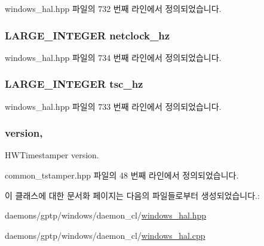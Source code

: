 windows\+\_\+hal.\+hpp 파일의 732 번째 라인에서 정의되었습니다.

\subsubsection[{\texorpdfstring{netclock\+\_\+hz}{netclock_hz}}]{\setlength{\rightskip}{0pt plus 5cm}L\+A\+R\+G\+E\+\_\+\+I\+N\+T\+E\+G\+ER netclock\+\_\+hz\hspace{0.3cm}{\ttfamily [private]}}\hypertarget{class_windows_ether_timestamper_a9e4ba46145b31b628733af60187fc3c6}{}\label{class_windows_ether_timestamper_a9e4ba46145b31b628733af60187fc3c6}


windows\+\_\+hal.\+hpp 파일의 734 번째 라인에서 정의되었습니다.

\subsubsection[{\texorpdfstring{tsc\+\_\+hz}{tsc_hz}}]{\setlength{\rightskip}{0pt plus 5cm}L\+A\+R\+G\+E\+\_\+\+I\+N\+T\+E\+G\+ER tsc\+\_\+hz\hspace{0.3cm}{\ttfamily [private]}}\hypertarget{class_windows_ether_timestamper_a259066718bc34c6231bbefd0b7093b6e}{}\label{class_windows_ether_timestamper_a259066718bc34c6231bbefd0b7093b6e}


windows\+\_\+hal.\+hpp 파일의 733 번째 라인에서 정의되었습니다.

\subsubsection[{\texorpdfstring{version}{version}}]{ version\hspace{0.3cm}{\ttfamily [protected]}, {\ttfamily [inherited]}}\hypertarget{class_common_timestamper_ab22abc2906422da61885ac6c8e6a1a59}{}\label{class_common_timestamper_ab22abc2906422da61885ac6c8e6a1a59}


H\+W\+Timestamper version. 



common\+\_\+tstamper.\+hpp 파일의 48 번째 라인에서 정의되었습니다.



이 클래스에 대한 문서화 페이지는 다음의 파일들로부터 생성되었습니다.\+:\begin{DoxyCompactItemize}
\item 
daemons/gptp/windows/daemon\+\_\+cl/\hyperlink{windows__hal_8hpp}{windows\+\_\+hal.\+hpp}\item 
daemons/gptp/windows/daemon\+\_\+cl/\hyperlink{windows__hal_8cpp}{windows\+\_\+hal.\+cpp}\end{DoxyCompactItemize}
